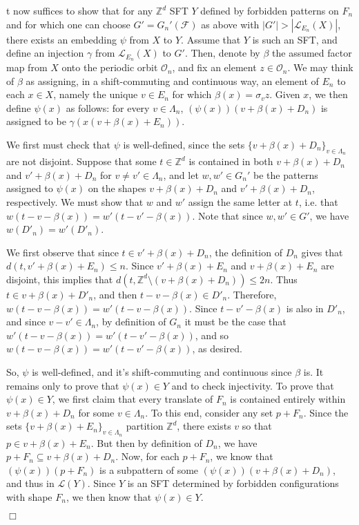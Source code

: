 \documentclass[12pt]{amsart}
\theoremstyle{definition}
\newenvironment{ProofOfEmbeddingThm}[1]
{\par\vskip2\parsep\noindent{\sc Proof of Theorem\ \ref{Thm:Embeddings}. }}{{\hfill
$\Box$}
\par\vskip2\parsep}
\begin{document}
\begin{ProofOfEmbeddingThm}
It now suffices to show that for any $\mathbb{Z}^d$ SFT $Y$ defined by forbidden patterns on $F_n$ and for which one can choose $G' = G_n'(\mathcal{F})$ as above with $|G'| > |\mathcal{L}_{E_n}(X)|$, there exists an embedding $\psi$ from $X$ to $Y$. Assume that $Y$ is such an SFT, and define an injection $\gamma$ from $\mathcal{L}_{E_n}(X)$ to $G'$. Then, denote by $\beta$ the assumed factor map from $X$ onto the periodic orbit $\mathcal{O}_n$, and fix an element $z \in \mathcal{O}_n$. We may think of $\beta$ as assigning, in a shift-commuting and continuous way, an element of $E_n$ to each $x \in X$, namely the unique $v \in E_n$ for which $\beta(x) = \sigma_v z$. Given $x$, we then define $\psi(x)$ as follows: for every $v \in \Lambda_n$, $(\psi(x))(v + \beta(x) + D_n)$ is assigned to be $\gamma(x(v + \beta(x) + E_n))$. 

We first must check that $\psi$ is well-defined, since the sets $\{v + \beta(x) + D_n\}_{v \in \Lambda_n}$ are not disjoint. 
Suppose that some $t \in \mathbb{Z}^d$ is contained in both $v + \beta(x) + D_n$ and $v' + \beta(x) + D_n$ for $v \neq v' \in \Lambda_n$, and let $w,w' \in G_n'$ be the patterns assigned to $\psi(x)$ on the shapes $v + \beta(x) + D_n$ and $v' + \beta(x) + D_n$, respectively. We must show that $w$ and $w'$ assign the same letter at $t$, i.e. that $w(t - v - \beta(x)) = w'(t - v' - \beta(x))$. Note that since $w,w' \in G'$, we have $w(D'_n) = w'(D'_n)$. 

We first observe that since $t \in v' + \beta(x) + D_n$, the definition of $D_n$ gives that $d(t, v' + \beta(x) + E_n) \leq n$. Since $v' + \beta(x) + E_n$ and $v + \beta(x) + E_n$ are disjoint, this implies that $d(t, \mathbb{Z}^d \setminus (v + \beta(x) + D_n)) \leq 2n$. Thus $t \in v + \beta(x) + D'_n$, and then $t - v - \beta(x) \in D'_n$. Therefore, $w(t - v - \beta(x)) = w'(t - v - \beta(x))$. Since $t - v' - \beta(x)$ is also in $D'_n$, and since $v - v' \in \Lambda_n$, by definition of $G_n$ it must be the case that $w'(t - v - \beta(x)) = w'(t - v' - \beta(x))$, and so 
$w(t - v - \beta(x)) = w'(t - v' - \beta(x))$, as desired.

So, $\psi$ is well-defined, and it's shift-commuting and continuous since $\beta$ is. It remains only to prove that $\psi(x) \in Y$ and to check injectivity. To prove that $\psi(x) \in Y$, we first claim that every translate of $F_n$ is contained entirely within $v + \beta(x) + D_n$ for some $v \in \Lambda_n$. To this end, consider any set $p + F_n$. Since the sets $\{v + \beta(x) + E_n\}_{v \in \Lambda_n}$ partition $\mathbb{Z}^d$, there exists $v$ so that $p \in v + \beta(x) + E_n$. But then by definition of $D_n$, we have $p + F_n \subseteq v + \beta(x) + D_n$. Now, for each $p + F_n$, we know that $(\psi(x))(p + F_n)$ is a subpattern of some $(\psi(x))(v + \beta(x) + D_n)$, and thus in $\mathcal{L}(Y)$. Since $Y$ is an SFT determined by forbidden configurations with shape $F_n$, we then know that $\psi(x) \in Y$. 


\end{ProofOfEmbeddingThm}
\end{document}
